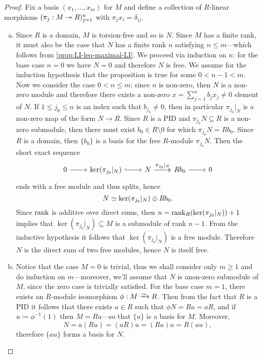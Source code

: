 \begin{proof}
Fix a basis \((x_1, \dots, x_m)\) for \(M\) and define a collection of
\(R\)-linear morphisms \((\pi_j: M \twoheadrightarrow R)_{j=1}^n\) with
\(\pi_j x_i = \delta_{i j}\).
\begin{enumerate}[(a)]\setlength\itemsep{0em}
\item Since \(R\) is a domain, \(M\) is torsion-free and so is \(N\). Since
  \(M\) has a finite rank, it must also be the case that \(N\) has a finite rank
  \(n\) satisfying \(n \leq m\)---which follows from
  \cref{prop:LI-leq-maximal-LI}. We proceed via induction on \(n\): for the base
  case \(n = 0\) we have \(N = 0\) and therefore \(N\) is free. We assume for
  the induction hypothesis that the proposition is true for some
  \(0 < n-1 < m\). Now we consider the case \(0 < n \leq m\): since \(n\) is
  non-zero, then \(N\) is a non-zero module and therefore there exists a
  non-zero \(x = \sum_{j=1}^n b_j x_j \neq 0\) element of \(N\). If
  \(1 \leq j_0 \leq n\) is an index such that \(b_{j_0} \neq 0\), then in
  particular \(\pi_{j_0}|_N\) is a non-zero map of the form \(N \to R\). Since
  \(R\) is a PID and \(\pi_{j_0} N \subseteq R\) is a non-zero submodule, then
  there must exist \(b_0 \in R \setminus 0\) for which \(\pi_{j_0} N = R
  b_0\). Since \(R\) is a domain, then \(\{b_0\}\) is a basis for the free
  \(R\)-module \(\pi_{j_0} N\). Then the short exact sequence
  \[
  \begin{tikzcd}
  0 \ar[r]
  &\ker(\pi_{j_0}|_N) \ar[r, hook]
  &N \ar[r, two heads, "\pi_{j_0}|_N"]
  &R b_0 \ar[r]
  &0
  \end{tikzcd}
  \]
  ends with a free module and thus splits, hence
  \[
  N \simeq \ker(\pi_{j_0}|_N) \oplus R b_0.
  \]
  Since \(\operatorname{rank}\) is additive over direct sums, then
  \(n = \operatorname{rank}_R(\ker(\pi_{j_0}|_N)) + 1\) implies that
  \(\ker(\pi_{j_0}|_N) \subseteq M\) is a submodule of rank \(n-1\). From the
  inductive hypothesis it follows that \(\ker(\pi_{j_0}|_N)\) is a free
  module. Therefore \(N\) is the direct sum of two free modules, hence \(N\) is
  itself free.

\item Notice that the case \(M = 0\) is trivial, thus we shall consider only
  \(m \geq 1\) and do induction on \(m\)---moreover, we'll assume that \(N\) is
  anon-zero submodule of \(M\), since the zero case is trivially satisfied. For
  the base case \(m = 1\), there exists an \(R\)-module isomorphism
  \(\phi: M \isoto R\). Then from the fact that \(R\) is a PID it follows that
  there exists \(a \in R\) such that \(\phi N = R a = a R\), and if
  \(u \coloneq \phi^{-1}(1)\) then \(M = R u\)---so that \(\{u\}\) is a basis
  for \(M\). Moreover,
  \[
  N = a (R u) = (a R) u = (R a) u = R (a u),
  \]
  therefore \(\{a u\}\) forms a basis for \(N\).


\end{enumerate}
\end{proof}
